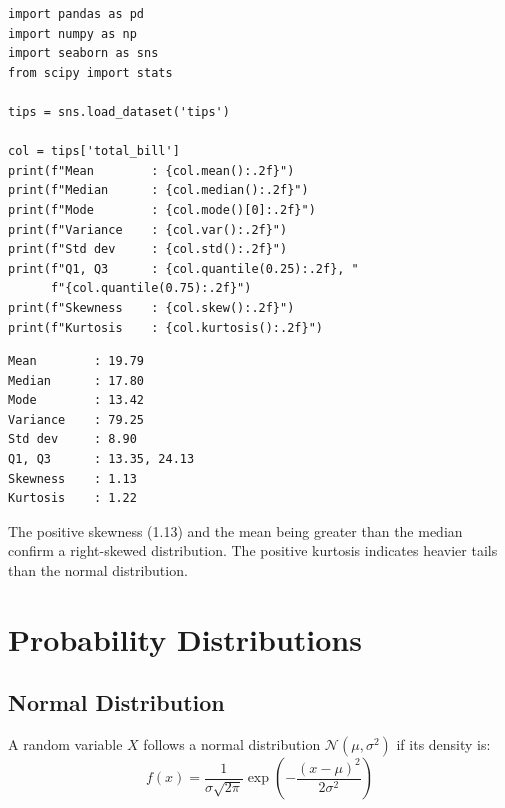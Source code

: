 \begin{codeblock}[title=\textbf{Python}]
\begin{verbatim}
import pandas as pd
import numpy as np
import seaborn as sns
from scipy import stats

tips = sns.load_dataset('tips')

col = tips['total_bill']
print(f"Mean        : {col.mean():.2f}")
print(f"Median      : {col.median():.2f}")
print(f"Mode        : {col.mode()[0]:.2f}")
print(f"Variance    : {col.var():.2f}")
print(f"Std dev     : {col.std():.2f}")
print(f"Q1, Q3      : {col.quantile(0.25):.2f}, "
      f"{col.quantile(0.75):.2f}")
print(f"Skewness    : {col.skew():.2f}")
print(f"Kurtosis    : {col.kurtosis():.2f}")
\end{verbatim}
\end{codeblock}

\begin{codeoutput}
\begin{verbatim}
Mean        : 19.79
Median      : 17.80
Mode        : 13.42
Variance    : 79.25
Std dev     : 8.90
Q1, Q3      : 13.35, 24.13
Skewness    : 1.13
Kurtosis    : 1.22
\end{verbatim}
\end{codeoutput}

\begin{remark}
The positive skewness (1.13) and the mean being greater than the median confirm a right-skewed distribution. The positive kurtosis indicates heavier tails than the normal distribution.
\end{remark}

\section{Probability Distributions}

\subsection{Normal Distribution}

\begin{definition}
A random variable $X$ follows a normal distribution $\mathcal{N}(\mu, \sigma^2)$ if its density is:
\[
f(x) = \frac{1}{\sigma\sqrt{2\pi}} \exp\!\left(-\frac{(x-\mu)^2}{2\sigma^2}\right)
\]
\end{definition}

